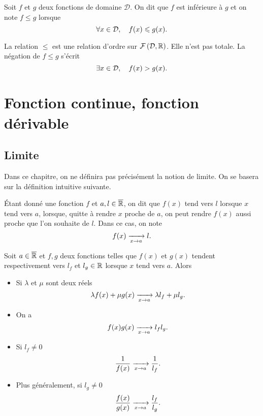 \documentclass{magnolia}
\begin{document}
\begin{definition}[utile=-3]
Soit $f$ et $g$ deux fonctions de domaine $\mathcal{D}$.
On dit que $f$ est inférieure à $g$ et on note $f\leq g$ lorsque
\[\forall x\in\mathcal{D} ,\quad f(x)\leqslant g(x).\]
\end{definition}

\begin{remarques}
\remarque La relation $\leq$ est une relation d'ordre sur
  $\mathcal{F}\left(\mathcal{D},\mathbb{R}\right)$. Elle n'est pas totale.
\remarque La négation de $f\leq g$ s'écrit
  \[\exists x\in\mathcal{D} ,\quad f(x)> g(x).\]
\end{remarques}


\section{Fonction continue, fonction dérivable}

\subsection{Limite}

Dans ce chapitre, on ne définira pas précisément la notion de limite. On se basera sur la
définition intuitive suivante.

\begin{definition}[utile=-3]
Étant donné une fonction $f$ et $a,l\in\overline{\mathbb{R}}$, on dit que $f(x)$ tend vers
$l$ lorsque $x$ tend vers $a$, lorsque, quitte à rendre $x$ proche de $a$, on
peut rendre $f(x)$ aussi proche que l'on souhaite de $l$. Dans ce cas, on
note
$$f(x)\xrightarrow[x\rightarrow a]{}l.$$
\end{definition}

\begin{proposition}[utile=-3]
Soit $a\in\overline{\mathbb{R}}$ et $f, g$ deux fonctions telles que
$f(x)$ et $g(x)$ tendent respectivement vers $l_f$ et $l_g\in\mathbb{R}$ lorsque $x$
tend vers $a$. Alors
\begin{itemize}
\item Si $\lambda$ et $\mu$ sont deux réels
  \[\lambda f(x)+\mu g(x)\xrightarrow[x\rightarrow a]{} \lambda l_f+\mu l_g.\]
\item On a
  \[f(x)g(x) \xrightarrow[x\rightarrow a]{} l_f l_g.\]
\item Si $l_f\not=0$
  \[\frac{1}{f(x)}\xrightarrow[x\rightarrow a]{}\frac{1}{l_f}.\]
\item Plus généralement, si $l_g\not=0$
  \[\frac{f(x)}{g(x)}\xrightarrow[x\rightarrow a]{}\frac{l_f}{l_g}.\]
\end{itemize}
\end{proposition}
\end{document}
